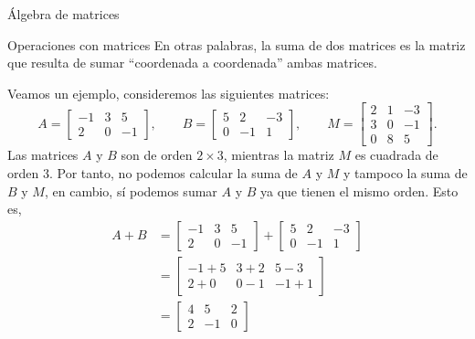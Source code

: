 \begin{chapter}{\'Algebra de matrices}
\begin{section}{Operaciones con matrices}
                 En otras palabras, la suma de dos matrices es la matriz que resulta de sumar ``coordenada a coordenada'' ambas matrices. 
                
                Veamos un ejemplo, consideremos las siguientes matrices:
                \begin{equation*}
                A = \begin{bmatrix} -1&3&5 \\ 2&0&-1  \end{bmatrix}, \qquad
                B = \begin{bmatrix} 5&2&-3 \\ 0&-1&1  \end{bmatrix}, \qquad
                M = \begin{bmatrix} 2&1&-3 \\ 3&0&-1 \\ 0&8&5 \end{bmatrix}.
                \end{equation*}
                Las matrices $A$ y $B$ son de orden $2 \times 3$, mientras la matriz $M$ es cuadrada de orden 3. Por tanto, no podemos calcular la suma de $A$ y $M$ y tampoco la suma de $B$ y $M$, en cambio, sí podemos sumar $A$ y $B$ ya que tienen el mismo orden. Esto es,
                \begin{align*}
                A + B &= \begin{bmatrix} -1&3&5 \\ 2&0&-1  \end{bmatrix}+ \begin{bmatrix} 5&2&-3 \\ 0&-1&1  \end{bmatrix} \\
                &=  \begin{bmatrix} -1+5&3+2&5-3 \\ 2+0&0-1&-1+1  \end{bmatrix} \\
                &=  \begin{bmatrix} 4&5&2 \\ 2&-1&0  \end{bmatrix}
                \end{align*}
                

\end{section}
\end{chapter}
